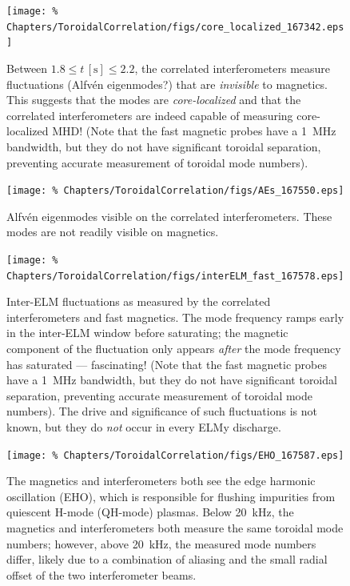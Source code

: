 \begin{figure}[h!]
  \centering
  \texttt{[image: \%
    Chapters/ToroidalCorrelation/figs/core\_localized\_167342.eps]}
  \caption[Toroidal mode numbers of \emph{core-localized} MHD]{%
    Between $1.8 \leq t \, [\text{s}] \leq 2.2$,
    the correlated interferometers measure fluctuations
    (Alfv\'{e}n eigenmodes?) that are \emph{invisible} to magnetics.
    This suggests that the modes are \emph{core-localized} and
    that the correlated interferometers are indeed capable
    of measuring core-localized MHD!
    (Note that the fast magnetic probes have a \SI{1}{\mega\hertz} bandwidth,
    but they do not have significant toroidal separation,
    preventing accurate measurement of toroidal mode numbers).}
\label{fig:ToroidalCorrelation:core_localized}
\end{figure}

\begin{figure}[h!]
  \centering
  \texttt{[image: \%
    Chapters/ToroidalCorrelation/figs/AEs\_167550.eps]}
  \caption[Toroidal mode numbers of Alfv\'{e}n eigenmodes]{%
    Alfv\'{e}n eigenmodes visible
    on the correlated interferometers.
    These modes are not readily visible on magnetics.}
\label{fig:ToroidalCorrelation:AEs}
\end{figure}

\begin{figure}[h!]
  \centering
  \texttt{[image: \%
    Chapters/ToroidalCorrelation/figs/interELM\_fast\_167578.eps]}
  \caption[Toroidal mode numbers of inter-ELM fluctuations]{%
    Inter-ELM fluctuations as measured by
    the correlated interferometers and fast magnetics.
    The mode frequency ramps early in the inter-ELM window before saturating;
    the magnetic component of the fluctuation only appears \emph{after}
    the mode frequency has saturated --- fascinating!
    (Note that the fast magnetic probes have a \SI{1}{\mega\hertz} bandwidth,
    but they do not have significant toroidal separation,
    preventing accurate measurement of toroidal mode numbers).
    The drive and significance of such fluctuations is not known, but
    they do \emph{not} occur in every ELMy discharge.}
\label{fig:ToroidalCorrelation:interELM_fast}
\end{figure}

\begin{figure}[h!]
  \centering
  \texttt{[image: \%
    Chapters/ToroidalCorrelation/figs/EHO\_167587.eps]}
  \caption[Toroidal mode numbers of the edge harmonic oscillation (EHO)]{%
    The magnetics and interferometers both see the
    edge harmonic oscillation (EHO), which is responsible for
    flushing impurities from quiescent H-mode (QH-mode) plasmas.
    Below \SI{20}{\kilo\hertz}, the magnetics and interferometers
    both measure the same toroidal mode numbers; however,
    above \SI{20}{\kilo\hertz}, the measured mode numbers differ,
    likely due to a combination of aliasing and the small radial offset
    of the two interferometer beams.}
\label{fig:ToroidalCorrelation:EHO}
\end{figure}

